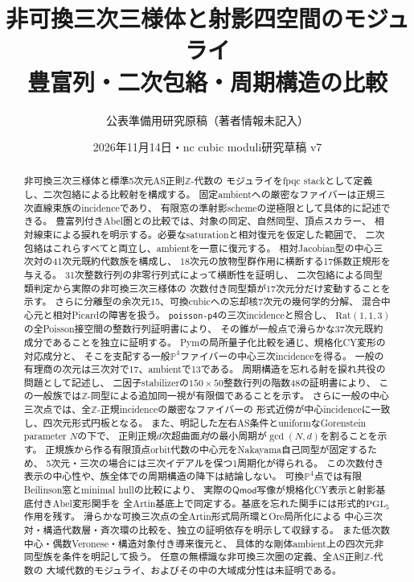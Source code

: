 \documentclass[11pt,a4paper]{ltjsarticle}
\title{非可換三次三様体と射影四空間のモジュライ\\豊富列・二次包絡・周期構造の比較}
\author{公表準備用研究原稿（著者情報未記入）}
\date{2026年11月14日・nc cubic moduli研究草稿 v7}
\numberwithin{equation}{section}
\newcommand{\PP}{\mathbb P}
\newcommand{\PGL}{\mathrm{PGL}}
\begin{document}
\maketitle
\begin{abstract}
非可換三次三様体と標準5次元AS正則$\mathbb Z$-代数の
モジュライをfpqc stackとして定義し、二次包絡による比較射を構成する。
固定ambientへの厳密なファイバーは正規三次直線束族のincidenceであり、
有限窓の準射影schemeの逆極限として具体的に記述できる。
豊富列付きAbel圏との比較では、対象の同定、自然同型、頂点スカラー、
相対線束による捩れを明示する。必要なsaturationと相対復元を仮定した範囲で、
二次包絡はこれらすべてと両立し、ambientを一意に復元する。
相対Jacobian型の中心三次対の41次元既約代数族を構成し、
18次元の放物型群作用に横断する17係数正規形を与える。
31次整数行列の非零行列式によって横断性を証明し、
二次包絡による同型類判定から実際の非可換三次三様体の
次数付き同型類が17次元分だけ変動することを示す。
さらに分離型の余次元15、可換cubicへの忘却核7次元の幾何学的分解、
混合中心元と相対Picardの障害を扱う。
\texttt{poisson-p4}の三次incidenceと照合し、
$\mathrm{Rat}(1,1,3)$の全Poisson接空間の整数行列証明書により、
その錐が一般点で滑らかな37次元既約成分であることを独立に証明する。
Pymの局所量子化比較を通じ、規格化CY変形の対応成分と、
そこを支配する一般$\PP^4$ファイバーの中心三次incidenceを得る。
一般の有理商の次元は三次対で17、ambientで13である。
周期構造を忘れる射を捩れ共役の問題として記述し、
二因子stabilizerの$150\times50$整数行列の階数48の証明書により、
この一般族では$\mathbb Z$-同型による追加同一視が有限個であることを示す。
さらに一般の中心三次点では、全$\mathbb Z$-正規incidenceの厳密なファイバーの
形式近傍が中心incidenceに一致し、四次元形式円板となる。
また、明記した左右AS条件とuniformなGorenstein parameter $N$の下で、
正則正規$d$次超曲面\emph{対}の最小周期が$\gcd(N,d)$を割ることを示す。
正規族から作る有限頂点orbit代数の中心元をNakayama自己同型が固定するため、
5次元・三次の場合には三次イデアルを保つ1周期化が得られる。
この次数付き表示の中心性や、族全体での周期構造の降下は結論しない。
可換$\PP^4$点では有限Beilinson窓とminimal hullの比較により、
実際の$\mathsf{Qmod}$写像が規格化CY表示と射影基底付きAbel変形関手を
全Artin基底上で同定する。基底を忘れた関手には形式的$\PGL_5$作用を残す。
滑らかな可換三次点の全Artin形式局所環とOre局所化による
中心三次対・構造代数層・斉次環の比較を、独立の証明依存を明示して収録する。
また低次数中心・偶数Veronese・構造対象付き導来復元と、
具体的な剛体ambient上の四次元非同型族を条件を明記して扱う。
任意の無標識な非可換三次圏の定義、全AS正則$\mathbb Z$-代数の
大域代数的モジュライ、およびその中の大域成分性は未証明である。
\end{abstract}
\tableofcontents
\end{document}

